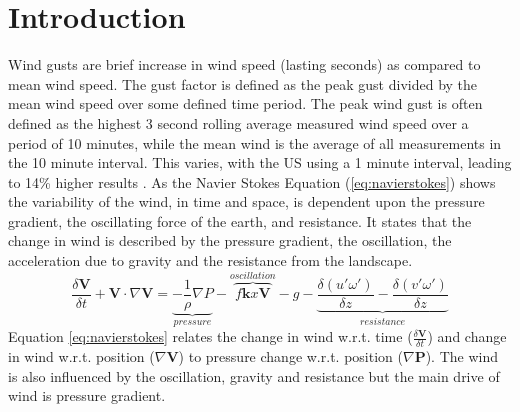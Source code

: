 
\chapter{Introduction} %

\label{Chapter1} %


\newcommand{\keyword}[1]{\textbf{#1}}
\newcommand{\tabhead}[1]{\textbf{#1}}
\newcommand{\code}[1]{\texttt{#1}}
\newcommand{\file}[1]{\texttt{\bfseries#1}}
\newcommand{\option}[1]{\texttt{\itshape#1}}

Wind gusts are brief increase in wind speed (lasting seconds) as compared to mean wind speed. The gust factor is defined as the peak gust divided by the mean wind speed over some defined time period. The peak wind gust is often defined as the highest 3 second rolling average measured wind speed over a period of 10 minutes, while the mean wind is the average of all measurements in the 10 minute interval. This varies, with the US using a 1 minute interval, leading to 14\% higher results \cite{why_wind_gusts}. As the Navier Stokes Equation (\ref{eq:navierstokes}) shows the variability of the wind, in time and space, is dependent upon the pressure gradient, the oscillating force of the earth, and resistance. It states that the change in wind is described by the pressure gradient, the oscillation, the acceleration due to gravity and the resistance from the landscape.
\begin{equation}
    \label{eq:navierstokes}
    \frac{\delta \mathbf{V}}{\delta t} + \mathbf{V}\cdot\nabla\mathbf{V} = \underbrace{-\frac{1}{\rho}\nabla P}_{pressure} -\overbrace{ f\mathbf{k}x\mathbf{V}}^{oscillation} - g - \underbrace{\frac{\delta(u'\omega')}{\delta z} - \frac{\delta(v'\omega')}{\delta z}}_{resistance}
\end{equation}
Equation \ref{eq:navierstokes} relates the change in wind w.r.t. time ($\frac{\delta \boldsymbol{V}}{\delta t}$) and change in wind w.r.t. position ($\nabla\boldsymbol{V}$) to pressure change w.r.t. position ($\nabla\boldsymbol{P}$). The wind is also influenced by the oscillation, gravity and resistance but the main drive of wind is pressure gradient\cite{uncertainties_in_numerical_weather_predictions}.

